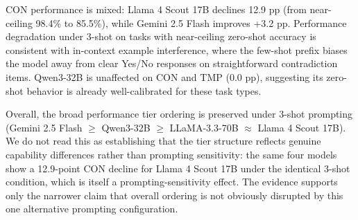 CON performance is mixed: Llama 4 Scout 17B declines 12.9 pp (from near-ceiling 98.4\% to 85.5\%), while Gemini 2.5 Flash improves +3.2 pp. Performance degradation under 3-shot on tasks with near-ceiling zero-shot accuracy is consistent with in-context example interference, where the few-shot prefix biases the model away from clear Yes/No responses on straightforward contradiction items. Qwen3-32B is unaffected on CON and TMP (0.0 pp), suggesting its zero-shot behavior is already well-calibrated for these task types.

Overall, the broad performance tier ordering is preserved under 3-shot prompting (Gemini 2.5 Flash $\geq$ Qwen3-32B $\geq$ LLaMA-3.3-70B $\approx$ Llama 4 Scout 17B). We do not read this as establishing that the tier structure reflects genuine capability differences rather than prompting sensitivity: the same four models show a 12.9-point CON decline for Llama 4 Scout 17B under the identical 3-shot condition, which is itself a prompting-sensitivity effect. The evidence supports only the narrower claim that overall ordering is not obviously disrupted by this one alternative prompting configuration.


